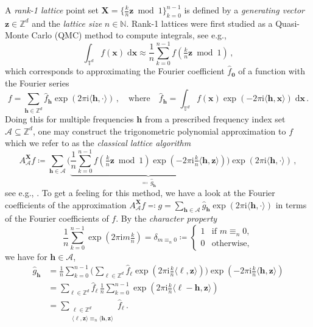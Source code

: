 \documentclass[a4paper]{amsart}
\renewcommand{\hat}{\widehat}
\newcommand{\modone}{\bmod{}1}
\begin{document}
A \emph{rank-1 lattice} point set $\bm X = \{\frac kn \bm z \modone \}_{k=0}^{n-1}$ is defined by a \emph{generating vector} $\bm z\in\mathds Z^d$ and the \emph{lattice size} $n\in\mathds N$.
Rank-1 lattices were first studied as a Quasi-Monte Carlo (QMC) method to compute integrals, see e.g., \cite{Sloan94}
\begin{equation*}
    \int_{\mathds T^d} f(\bm x) \;\mathrm d\bm x
    \approx \frac 1n \sum_{k=0}^{n-1} f(\tfrac kn \bm z \modone) \,,
\end{equation*}
which corresponds to approximating the Fourier coefficient $\hat f_{\bm 0}$ of a function with the Fourier series
\begin{equation*}
    f = \sum_{\bm h\in\mathds Z^d} \hat f_{\bm h} \exp(2\pi\mathrm i\langle\bm h, \cdot\rangle) \,,
    \quad\text{where}\quad
    \hat f_{\bm h} = \int_{\mathds T^d} f(\bm x) \exp(-2\pi\mathrm i\langle\bm h,\bm x\rangle) \;\mathrm d\bm x \,.
\end{equation*}
Doing this for multiple frequencies $\bm h$ from a prescribed frequency index set $\mathcal A\subseteq\mathds Z^d$, one may construct the trigonometric polynomial approximation to $f$ which we refer to as the \emph{classical lattice algorithm}
\begin{equation}\label{eq:classical}
    A_{\mathcal A}^{\bm X} f
    \coloneqq \sum_{\bm h\in\mathcal A}
    \Big( \underbrace{\frac 1n \sum_{k=0}^{n-1} f(\tfrac kn \bm z\modone) \exp(-2\pi\mathrm i\tfrac kn \langle\bm h,\bm z\rangle)}_{\eqqcolon\,\hat g_{\bm h}} \Big)
    \exp(2\pi\mathrm i\langle\bm h,\cdot\rangle) \,,
\end{equation}
see e.g., \cite{KSW06, KaPoVo13, kaemmererdiss, PlPoStTa18, CKNS20, DKP22}.
To get a feeling for this method, we have a look at the Fourier coefficients of the approximation $A_{\mathcal A}^{\bm X} f \eqqcolon g = \sum_{\bm h\in\mathcal A} \hat g_{\bm h} \exp(2\pi\mathrm i\langle\bm h,\cdot\rangle)$ in terms of the Fourier coefficients of $f$.
By the \emph{character property}
\begin{equation*}
    \frac 1n \sum_{k=0}^{n-1} \exp(2\pi\mathrm i m \tfrac kn) = \delta_{m\equiv_n 0}
    \coloneqq \begin{cases} 1 & \text{if } m\equiv_n 0, \\ 
    0 & \text{otherwise,} \end{cases}
\end{equation*}
we have for $\bm h\in\mathcal A$,
\begin{align}
    \hat g_{\bm h}
    &= \frac 1n \sum_{k=0}^{n-1} \Big( \sum_{\bm\ell\in\mathds Z^d} \hat f_{\bm\ell} \exp(2\pi\mathrm i\tfrac kn \langle\bm\ell,\bm z\rangle) \Big) \exp(-2\pi\mathrm i\tfrac kn\langle\bm h,\bm z\rangle) \nonumber \\
    &= \sum_{\bm\ell\in\mathds Z^d} \hat f_{\bm\ell} \, \frac 1n \sum_{k=0}^{n-1} \exp(2\pi\mathrm i\tfrac kn \langle\bm\ell-\bm h,\bm z\rangle) \nonumber \\
    &= \sum_{\substack{\bm\ell\in\mathds Z^d \\ \langle\bm\ell,\bm z\rangle\equiv_n\langle\bm h,\bm z\rangle}} \!\!\!\!\!\! \hat f_{\bm\ell} \label{eq:aliasing} \,.
\end{align}
\end{document}
